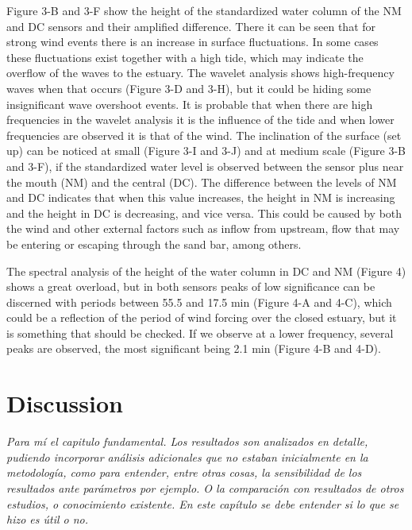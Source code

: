 \documentclass[11pt,letterpaper]{article}
\begin{document}
Figure 3-B and 3-F show the height of the standardized water column of the NM and DC sensors and their amplified difference. There it can be seen that for strong wind events there is an increase in surface fluctuations. In some cases these fluctuations exist together with a high tide, which may indicate the overflow of the waves to the estuary. The wavelet analysis shows high-frequency waves when that occurs (Figure 3-D and 3-H), but it could be hiding some insignificant wave overshoot events. It is probable that when there are high frequencies in the wavelet analysis it is the influence of the tide and when lower frequencies are observed it is that of the wind.
The inclination of the surface (set up) can be noticed at small (Figure 3-I and 3-J) and at medium scale (Figure 3-B and 3-F), if the standardized water level is observed between the sensor plus near the mouth (NM) and the central (DC). The difference between the levels of NM and DC indicates that when this value increases, the height in NM is increasing and the height in DC is decreasing, and vice versa. This could be caused by both the wind and other external factors such as inflow from upstream, flow that may be
entering or escaping through the sand bar, among others.


The spectral analysis of the height of the water column in DC and NM (Figure 4) shows a great overload, but in both sensors peaks of low significance can be discerned with periods between 55.5 and 17.5 min (Figure 4-A and 4-C), which could be a reflection of the period of wind forcing over the closed estuary, but it is something that should be checked. If we observe at a lower frequency, several peaks are observed, the most significant being 2.1 min (Figure 4-B and 4-D).



\section{Discussion}

\textit{Para mí el capitulo fundamental. Los resultados son analizados en detalle, pudiendo incorporar análisis adicionales que no estaban inicialmente en la metodología, como para entender, entre otras cosas, la sensibilidad de los resultados ante parámetros por ejemplo. O la comparación con resultados de otros estudios, o conocimiento existente. En este capítulo se debe entender si lo que se hizo es útil o no.}
\end{document}
